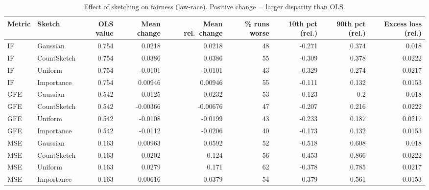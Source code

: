 \begin{table}[t]
\centering
\small
\begin{tabular}{llrrrrrrr}
\toprule
Metric & Sketch & OLS value & Mean change & Mean rel.\ change & \% runs worse & 10th pct (rel.) & 90th pct (rel.) & Excess loss (rel.) \\
\midrule
IF & Gaussian & 0.754 & 0.0218 & 0.0218 & 48 & -0.271 & 0.374 & 0.018 \\
IF & CountSketch & 0.754 & 0.0386 & 0.0386 & 55 & -0.309 & 0.378 & 0.0222 \\
IF & Uniform & 0.754 & -0.0101 & -0.0101 & 43 & -0.329 & 0.274 & 0.0217 \\
IF & Importance & 0.754 & 0.00946 & 0.00946 & 55 & -0.111 & 0.132 & 0.0153 \\
\midrule
GFE & Gaussian & 0.542 & 0.0125 & 0.0232 & 53 & -0.123 & 0.2 & 0.018 \\
GFE & CountSketch & 0.542 & -0.00366 & -0.00676 & 47 & -0.207 & 0.216 & 0.0222 \\
GFE & Uniform & 0.542 & -0.0108 & -0.0199 & 43 & -0.233 & 0.187 & 0.0217 \\
GFE & Importance & 0.542 & -0.0112 & -0.0206 & 40 & -0.173 & 0.132 & 0.0153 \\
\midrule
MSE & Gaussian & 0.163 & 0.00963 & 0.0592 & 52 & -0.518 & 0.608 & 0.018 \\
MSE & CountSketch & 0.163 & 0.0202 & 0.124 & 56 & -0.453 & 0.866 & 0.0222 \\
MSE & Uniform & 0.163 & 0.0279 & 0.171 & 62 & -0.378 & 0.785 & 0.0217 \\
MSE & Importance & 0.163 & 0.00616 & 0.0379 & 54 & -0.379 & 0.561 & 0.0153 \\
\bottomrule
\end{tabular}
\caption{Effect of sketching on fairness (law-race). Positive change = larger disparity than OLS.}
\label{tab:harm_law-race}
\end{table}
